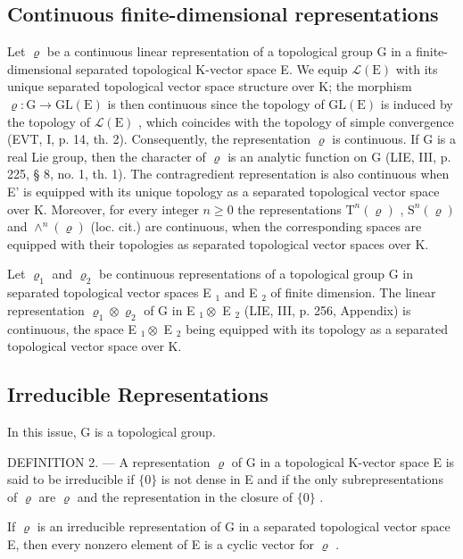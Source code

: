 \subsection{Continuous finite-dimensional representations}

Let \(\varrho\) be a continuous linear representation of a topological group G in a finite-dimensional separated topological K-vector space E. We equip \(\mathcal{L}(\mathrm{E})\) with its unique separated topological vector space structure over K; the morphism \(\varrho\colon\mathrm{G}\to\mathrm{GL}(\mathrm{E})\) is then continuous since the topology of \(\mathrm{GL}(\mathrm{E})\) is induced by the topology of \(\mathcal{L}(\mathrm{E})\) , which coincides with the topology of simple convergence (EVT, I, p. 14, th. 2). Consequently, the representation \(\varrho\) is continuous. If G is a real Lie group, then the character of \(\varrho\) is an analytic function on G (LIE, III, p. 225, § 8, no. 1, th. 1). The contragredient representation is also continuous when E' is equipped with its unique topology as a separated topological vector space over K. Moreover, for every integer \(n\geqslant0\) the representations \(\mathrm{T}^{n}(\varrho)\) , \(\mathrm{S}^{n}(\varrho)\) and \(\wedge^{n}(\varrho)\) (loc. cit.) are continuous, when the corresponding spaces are equipped with their topologies as separated topological vector spaces over K.

Let \(\varrho_{1}\) and \(\varrho_{2}\) be continuous representations of a topological group G in separated topological vector spaces E \(_{1}\) and E \(_{2}\) of finite dimension. The linear representation \(\varrho_{1} \otimes \varrho_{2}\) of G in E \(_{1} \otimes\) E \(_{2}\) (LIE, III, p. 256, Appendix) is continuous, the space E \(_{1} \otimes\) E \(_{2}\) being equipped with its topology as a separated topological vector space over K.

\subsection{Irreducible Representations}

In this issue, G is a topological group.

DEFINITION 2. --- A representation \(\varrho\) of G in a topological K-vector space E is said to be irreducible if \(\{0\}\) is not dense in E and if the only subrepresentations of \(\varrho\) are \(\varrho\) and the representation in the closure of \(\{0\}\) .

If \(\varrho\) is an irreducible representation of G in a separated topological vector space E, then every nonzero element of E is a cyclic vector for \(\varrho\) .

